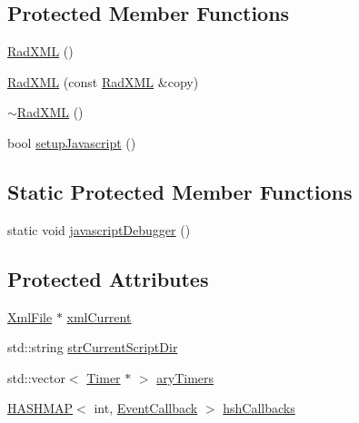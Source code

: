 \subsection*{Protected Member Functions}
\begin{DoxyCompactItemize}
\item 
\hyperlink{class_rad_xml_1_1_rad_x_m_l_afe957957280ee9a555f8193774c42cb2}{Rad\-X\-M\-L} ()
\item 
\hyperlink{class_rad_xml_1_1_rad_x_m_l_a59a837219b90795017f6812349fae904}{Rad\-X\-M\-L} (const \hyperlink{class_rad_xml_1_1_rad_x_m_l}{Rad\-X\-M\-L} \&copy)
\item 
\hyperlink{class_rad_xml_1_1_rad_x_m_l_af5b7db7da7a75ab60e9efc9e6669e60f}{$\sim$\-Rad\-X\-M\-L} ()
\item 
bool \hyperlink{class_rad_xml_1_1_rad_x_m_l_a1f43a3b4d50dbccc286ccdff46d295ba}{setup\-Javascript} ()
\end{DoxyCompactItemize}
\subsection*{Static Protected Member Functions}
\begin{DoxyCompactItemize}
\item 
static void \hyperlink{class_rad_xml_1_1_rad_x_m_l_a354ad241e433bcd3d65f02e918460b8b}{javascript\-Debugger} ()
\end{DoxyCompactItemize}
\subsection*{Protected Attributes}
\begin{DoxyCompactItemize}
\item 
\hyperlink{class_rad_xml_1_1_xml_file}{Xml\-File} $\ast$ \hyperlink{class_rad_xml_1_1_rad_x_m_l_a9bac803bf540c58c98901d56d2892ed2}{xml\-Current}
\item 
std\-::string \hyperlink{class_rad_xml_1_1_rad_x_m_l_a4fbdf937209a1d2fea48931facbecc0a}{str\-Current\-Script\-Dir}
\item 
std\-::vector$<$ \hyperlink{class_rad_xml_1_1_timer}{Timer} $\ast$ $>$ \hyperlink{class_rad_xml_1_1_rad_x_m_l_ac34a4e20b50d5d5388215497a4f8b498}{ary\-Timers}
\item 
\hyperlink{_rad_xml_xml_file_8h_a850417c8db77ee8afd12a38071844035}{H\-A\-S\-H\-M\-A\-P}$<$ int, \hyperlink{class_rad_xml_1_1_rad_x_m_l_ab812a58a3bf015e646979a83309db244}{Event\-Callback} $>$ \hyperlink{class_rad_xml_1_1_rad_x_m_l_ab9b3487c4bf76e836f52c080b3b12665}{hsh\-Callbacks}
\end{DoxyCompactItemize}
